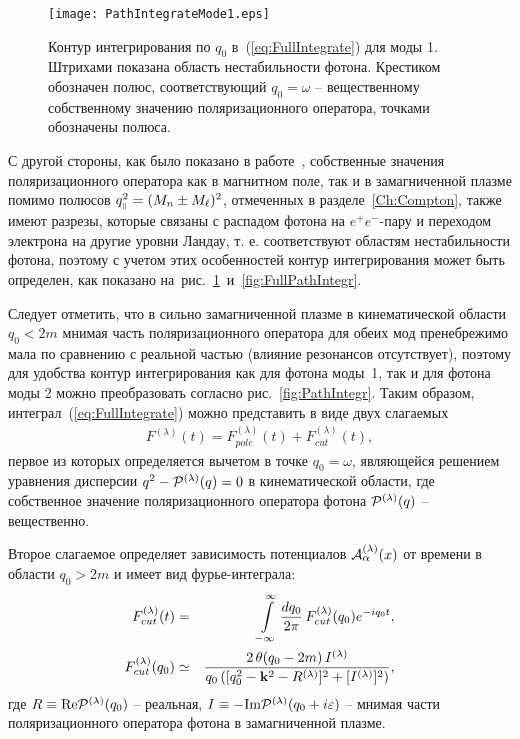 \begin{center}
	\begin{figure}[t!]\centering
		\texttt{[image: PathIntegrateMode1.eps]}
		\caption{Контур интегрирования по $q_0$ в~(\ref{eq:FullIntegrate}) для моды 1. Штрихами показана область нестабильности фотона. Крестиком обозначен полюс, соответствующий $q_0=\omega$ -- вещественному собственному значению поляризационного оператора, точками обозначены полюса.} \label{fig:FullPathIntegrMode1}
	\end{figure}
\end{center}

С другой стороны, как было показано в работе~\cite{MikhChist:2001}, собственные значения поляризационного оператора как в магнитном поле, так и в замагниченной плазме помимо полюсов $q_{\mbox{\tiny $\|$}}^2=(M_n\pm M_\ell)^2$, отмеченных в разделе~\ref{Ch:Compton}, также имеют разрезы, которые связаны с распадом фотона на $e^+e^-$-пару и переходом электрона на другие уровни Ландау, т. е. соответствуют областям нестабильности фотона, поэтому с учетом этих особенностей  контур интегрирования может быть определен, как показано на~рис.~\ref{fig:FullPathIntegrMode1}~и~\ref{fig:FullPathIntegr}.

Следует отметить, что в сильно замагниченной плазме в кинематической области $q_0<2m$ мнимая часть поляризационного оператора для обеих мод пренебрежимо мала по сравнению с реальной частью (влияние резонансов отсутствует), поэтому для удобства контур интегрирования как для фотона моды~1, так и для фотона моды 2 можно преобразовать согласно рис.~\ref{fig:PathIntegr}. Таким образом, интеграл~(\ref{eq:FullIntegrate}) можно представить в виде двух слагаемых
\begin{eqnarray}
F^{(\lambda)}(t) = F^{(\lambda)}_{pole}(t) + F^{(\lambda)}_{cut}(t),
\label{eq:19}
\end{eqnarray}
%
первое из которых определяется вычетом в точке $q_0 = \omega$, являющейся
решением уравнения дисперсии $q^2 - {\cal P}^{(\lambda)}(q) = 0$ в кинематической области, где собственное 
значение поляризационного оператора фотона ${\cal P}^{(\lambda)}(q)$ -- вещественно. 

Второе слагаемое определяет зависимость потенциалов ${\cal A}^{(\lambda)}_\alpha(x)$ от времени
в области $q_0>2m$ и имеет вид
фурье-интеграла:
%
\begin{eqnarray}
F^{(\lambda)}_{cut}(t) &=& \int \limits_{- \infty}^{\infty} \frac{dq_0}{2 \pi}\,
F^{(\lambda)}_{cut}(q_0)e^{- i q_0 t},
\label{eq:20} 
\\
F^{(\lambda)}_{cut}(q_0) &\simeq& 
\frac{2 \,\theta (q_0  -  2 m)\,I^{(\lambda)}}
{q_0\,([ q_0^2 - {\bf k}^2 - R^{(\lambda)}]^2 + [I^{(\lambda)}]^2)},
\label{eq:21}
\end{eqnarray}
%
где $R \equiv \text{Re} {\cal P}^{(\lambda)}(q_0)$  – реальная, $I \equiv  - \text{Im} {\cal P}^{(\lambda)}(q_0 + i \varepsilon)$ – мнимая 
части поляризационного оператора фотона в замагниченной плазме.

